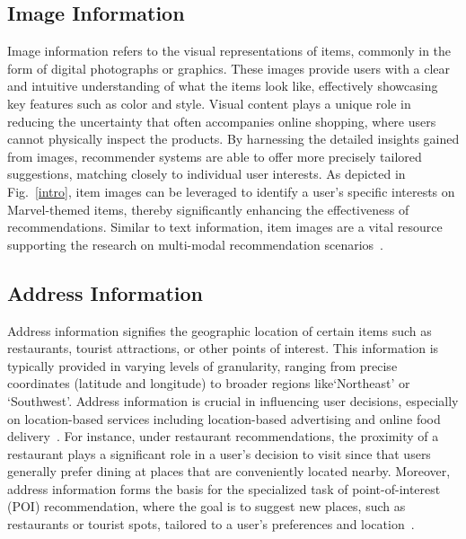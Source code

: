 \documentclass[lettersize,journal]{IEEEtran}
\newcommand{\fig}{Fig.\xspace}
\begin{document}
\subsection{Image Information}
{Image} information refers to the visual representations of items, commonly in the form of digital photographs or graphics. These images provide users with a clear and intuitive understanding of what the items look like, effectively showcasing key features such as color and style. Visual content plays a unique role in reducing the uncertainty that often accompanies online shopping, where users cannot physically inspect the products. By harnessing the detailed insights gained from images, recommender systems are able to offer more precisely tailored suggestions, matching closely to individual user interests. As depicted in \fig~\ref{intro}, item images can be leveraged to identify a user's specific interests on Marvel-themed items, thereby significantly enhancing the effectiveness of recommendations. Similar to text information, item images are a vital resource supporting the research on multi-modal recommendation scenarios~\cite{MMSBR,Geng@EMNLP2023,Liu@TOIS2023}.

\subsection{Address Information}

Address information signifies the geographic location of certain items such as restaurants, tourist attractions, or other points of interest. This information is typically provided in varying levels of granularity, ranging from precise coordinates (latitude and longitude) to broader regions like`Northeast' or `Southwest'. Address information is crucial in influencing user decisions, especially on location-based services including location-based advertising and online food delivery~\cite{Qin@WSDM2023}. For instance, under restaurant recommendations, the proximity of a restaurant plays a significant role in a user’s decision to visit since that users generally prefer dining at places that are conveniently located nearby. Moreover, address information forms the basis for the specialized task of point-of-interest (POI) recommendation, where the goal is to suggest new places, such as restaurants or tourist spots, tailored to a user’s preferences and location~\cite{Ma@CIKM2018,Wang@ICDE2022,Qin@WSDM2023}.
\end{document}
